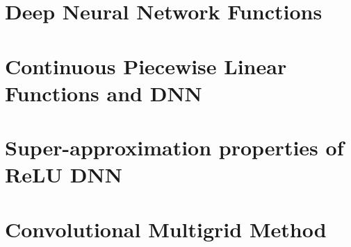 \chapter{Deep Neural Network Functions}




 



\chapter{Continuous Piecewise Linear Functions and DNN}
%







\chapter{Super-approximation properties of ReLU DNN}



\chapter{Convolutional Multigrid Method}




%











